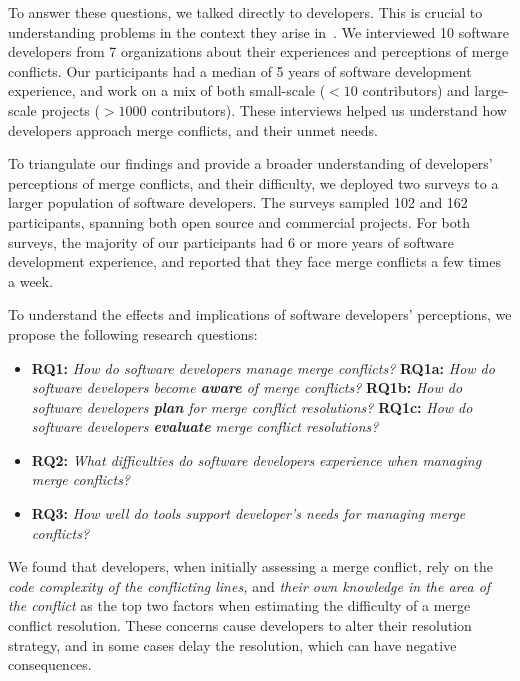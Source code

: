 To answer these questions, we talked directly to developers.
This is crucial to understanding problems in the context they arise in~\cite{fritz2010using, sillito2006questions, de2008answering, ko2007information}.
We interviewed 10 software developers from 7 organizations about their experiences and perceptions of merge conflicts. %
Our participants had a median of 5 years of software development experience, and work on a mix of both small-scale ($<10$ contributors) and large-scale projects ($>1000$ contributors).
These interviews helped us understand how developers approach merge conflicts, and their unmet needs.

To triangulate our findings and provide a broader understanding of developers' perceptions of merge conflicts, and their difficulty, we deployed two surveys to a larger population of software developers.
The surveys sampled 102 and 162 participants, spanning both open source and commercial projects. 
For both surveys, the majority of our participants had 6 or more years of software development experience, and reported that they face merge conflicts a few times a week.

To understand the effects and implications of software developers' perceptions, we propose the following research questions:

\begin{itemize}
\item \textbf{RQ1:} \textit{How do software developers manage merge conflicts?}
\subitem \textbf{RQ1a:} \textit{How do software developers become \textbf{aware} of merge conflicts?}
\subitem \textbf{RQ1b:} \textit{How do software developers \textbf{plan} for merge conflict resolutions?}
\subitem \textbf{RQ1c:} \textit{How do software developers \textbf{evaluate} merge conflict resolutions?}
\item \textbf{RQ2:} \textit{What difficulties do software developers experience when managing merge conflicts?}
\item \textbf{RQ3:} \textit{How well do tools support developer's needs for managing merge conflicts?}
\end{itemize}

We found that developers, when initially assessing a merge conflict, rely on the \textit{code complexity of the conflicting lines,} and \textit{their own knowledge in the area of the conflict} as the top two factors when estimating the difficulty of a merge conflict resolution. 
These concerns cause developers to alter their resolution strategy, and in some cases delay the resolution, which can have negative consequences.

